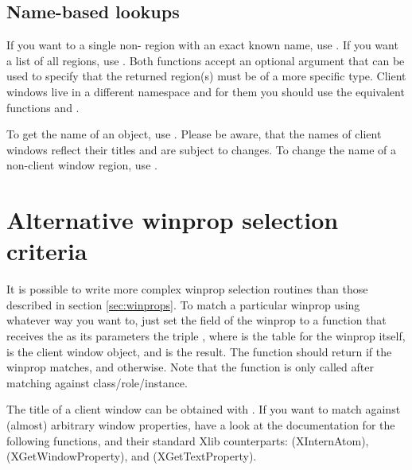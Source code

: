 \subsection{Name-based lookups}

If you want to a single non- region with an exact known 
name, use . If you want a list of all regions,
use . Both functions accept an optional argument
that can be used to specify that the returned region(s) must be of a more 
specific type. Client windows live in a different namespace and for them
you should use the equivalent functions 
and .

To get the name of an object, use . Please be
aware, that the names of client windows reflect their titles and
are subject to changes. To change the name of a non-client window
region, use .


\section{Alternative winprop selection criteria}

It is possible to write more complex winprop selection routines than
those described in section \ref{sec:winprops}. To match a particular
winprop using whatever way you want to, just set the 
field of the winprop to a function that receives the as its parameters
the triple , where  is the table for 
the winprop itself,  is the client window object,
and   is the  result.
The function should return  if the winprop matches, 
and  otherwise. Note that the  function
is only called after matching against class/role/instance.

The title of a client window can be obtained with .
If you want to match against (almost) arbitrary window properties,
have a look at the documentation for the following functions, and
their standard Xlib counterparts: 
(XInternAtom),  (XGetWindowProperty),
and  (XGetTextProperty).




